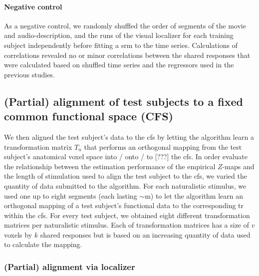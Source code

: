 
\paragraph{Negative control}
As a negative control, we randomly shuffled the order of segments of the movie
and audio-description, and the runs of the visual localizer for each training
subject independently before fitting a \ac{srm} to the time series.
Calculations of correlations revealed no or minor correlations between the
shared responses that were calculated based on shuffled time series and the
regressors used in the previous studies.


\subsection{(Partial) alignment of test subjects to a fixed common functional
space (CFS)}




We then aligned the test subject's data to the \ac{cfs} by letting the algorithm
learn a transformation matrix $T_{n}$ that performs an orthogonal mapping from
the test subject's anatomical voxel space into / onto / to [???] the \ac{cfs}.
In order evaluate the relationship between the estimation performance of the
empirical $Z$-maps and the length of stimulation used to align the test subject
to the \ac{cfs}, we varied the quantity of data submitted to the algorithm.
%
For each naturalistic stimulus, we used one up to eight segments (each lasting
$\sim$\unit[15]{m}) to let the algorithm learn an orthogonal mapping of a test
subject's functional data to the corresponding \acs{tr} within the \ac{cfs}.
%
For every test subject, we obtained eight different transformation matrices per
naturalistic stimulus.
%
Each of transformation matrices has a size of $v$ voxels by $k$ shared responses
but is based on an increasing quantity of data used to calculate the mapping.


\subsubsection{(Partial) alignment via localizer}

